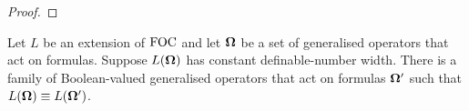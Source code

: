 \documentclass[../main/thesis.tex]{subfiles}
\begin{document}
\begin{proof}

\end{proof}

\begin{lem}
  Let $L$ be an extension of $\text{\upshape FOC}$ and let $\mathbf{\mathbf{\Omega}}$ be a set of generalised
  operators that act on formulas. Suppose $L(\mathbf{\mathbf{\Omega}})$ has constant
  definable-number width. There is a family of Boolean-valued generalised
  operators that act on formulas $\mathbf{\mathbf{\Omega}}'$ such that $L(\mathbf{\mathbf{\Omega}}) \equiv
  L(\mathbf{\mathbf{\Omega}}')$.
\end{lem}
\end{document}
